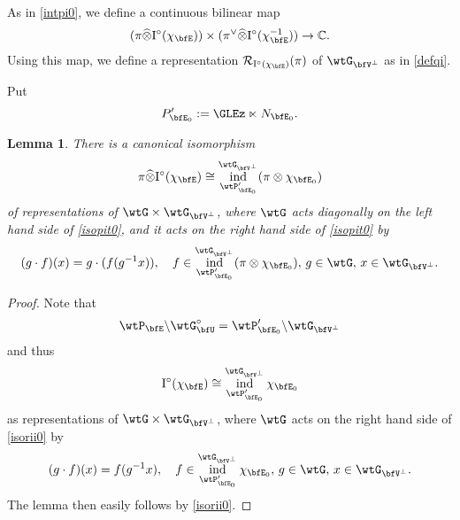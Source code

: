 \documentclass[12pt,a4paper]{amsart}
\newcommand{\CR}{{\mathcal {R}}}
\newcommand{\RI}{{\mathrm {I}}}
\DeclareMathOperator{\ind}{ind}
\numberwithin{equation}{section}
\newtheorem{lem}[thm]{Lemma}
\theoremstyle{remark}
\begin{document}
As in \eqref{intpi0}, we define a continuous bilinear map
\begin{equation}\label{picirc}
   (\pi\widehat \otimes \RI^\circ(\chi_{\bfE}))\times (\pi^\vee \widehat \otimes \RI^\circ(\chi_{\bfE}^{-1}))\rightarrow \C.
  \end{equation}
  Using this map, we define a representation $\CR_{\RI^\circ(\chi_{\bfE})}(\pi)$ of $\wtG_{\bfV^\perp}$  as in \eqref{defqi}.


  Put
  \begin{equation}\label{eq:P'E0}
    P'_{\bfE_0}:=\GLEz\ltimes N_{\bfE_0}.
  \end{equation}

 \begin{lem} There is a canonical isomorphism
  \begin{equation}
    \label{isopit0}
    \pi\widehat \otimes  \RI^\circ(\chi_{\bfE})\cong
    \ind_{\wtP'_{\bfE_0}}^{\wtG_{\bfV^\perp}} (\pi\otimes \chi_{\bfE_0})
  \end{equation}
  of representations of $\wtG\times \wtG_{\bfV^\perp}$, where
  $\wtG$ acts diagonally on the left hand side of \eqref{isopit0}, and it
  acts on the right hand side of \eqref{isopit0} by
  \[
    (g\cdot f)(x)=g\cdot (f(g^{-1}x)),\quad f\in
    \ind_{\wtP'_{\bfE_0}}^{\wtG_{\bfV^\perp}} (\pi\otimes \chi_{\bfE_0}),\, g\in
    \wtG, \,x\in \wtG_{\bfV^\perp}.
  \]
\end{lem}

   \begin{proof}
Note that
  \[
  \wtP_{\bfE}\backslash   \wtG^\circ_{\bfU}=\wtP'_{\bfE_0}\backslash   \wtG_{\bfV^\perp}
  \]
  and thus
  \begin{equation}\label{isorii0}
    {\RI^\circ(\chi_{\bfE})}\cong \ind_{\wtP'_{\bfE_0}}^{\wtG_{\bfV^\perp}}  \chi_{\bfE_0}
  \end{equation}
  as representations of $\wtG \times \wtG_{\bfV^\perp}$, where
  $\wtG$ acts on the right hand side of \eqref{isorii0} by
  \[
    (g\cdot f)(x)=f(g^{-1}x),\quad f\in
    \ind_{\wtP'_{\bfE_0}}^{\wtG_{\bfV^\perp}} \chi_{\bfE_0},\, g\in \wtG,
    \,x\in \wtG_{\bfV^\perp} .
  \]
  The lemma then easily follows by \eqref{isorii0}.
\end{proof}
\end{document}
